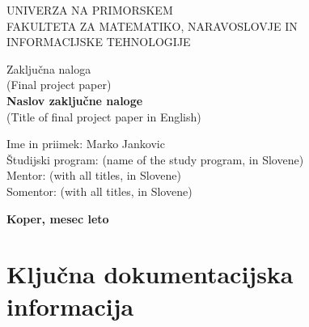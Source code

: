 \documentclass[12pt,a4paper,titlepage,openany]{report}
\begin{document}
\pagestyle{empty}
\begin{center}
\noindent \large UNIVERZA NA PRIMORSKEM\\
\large FAKULTETA ZA MATEMATIKO, NARAVOSLOVJE IN\\
INFORMACIJSKE TEHNOLOGIJE


\normalsize
\vspace{5.5cm}
Zaklju\v cna naloga\\
(Final project paper)\\
\textbf{\large Naslov zaklju\v cne naloge}\\
\normalsize
(Title of final project paper in English)\\
\end{center}

\begin{flushleft}
\vspace{5cm}
\noindent Ime in priimek: Marko Jankovic
\\
\noindent \v Studijski program: (name of the study program, in Slovene)
\\
\noindent Mentor: (with all titles, in Slovene)
\\
\noindent Somentor: (with all titles, in Slovene)
\\
\end{flushleft}

\vspace{4cm}
\begin{center}
\large \textbf{Koper, mesec leto}
\end{center}
\newpage

\pagestyle{fancy}

\section*{Klju\v cna dokumentacijska informacija}
\end{document}
